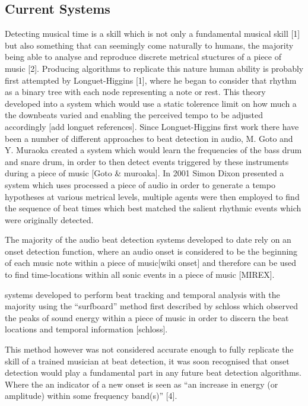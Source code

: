 \documentclass[a4paper, 11pt]{article}
\begin{document}
\subsection{Current Systems}

Detecting musical time is a skill which is not only a fundamental musical skill [1] but also something that can seemingly come naturally to humans, the majority being able to analyse and reproduce discrete metrical stuctures of a piece of music [2]. Producing algorithms to replicate this nature human ability is probably first attempted by Longuet-Higgins [1], where he began to consider that rhythm as a binary tree with each node representing a note or rest. This theory developed into a system which would use a static tolerence limit on how much a the downbeats varied and enabling the perceived tempo to be adjusted accordingly [add longuet references]. Since Longuet-Higgins first work there have been a number of different approaches to beat detection in audio, M. Goto and Y. Muraoka created a system which would learn the frequencies of the bass drum and snare drum, in order to then detect events triggered by these instruments during a piece of music [Goto \& muroaka]. In 2001 Simon Dixon presented a system which uses processed a piece of audio in order to generate a tempo hypotheses at various metrical levels, multiple agents were then employed to find the sequence of beat times which best matched the salient rhythmic events which were originally detected.

The majority of the audio beat detection systems developed to date rely on an onset detection function, where an audio onset is considered to be the beginning of each music note within a piece of music[wiki onset] and therefore can be used to find time-locations within all sonic events in a piece of music [MIREX]. 



systems developed to perform beat tracking and temporal analysis with the majority using the ``surfboard'' method first described by schloss which observed the peaks of sound energy within a piece of music in order to discern the beat locations and temporal information [schloss]. 

This method however was not considered accurate enough to fully replicate the skill of a trained musician at beat detection, it was soon recognised that onset detection would play a fundamental part in any future beat detection algorithms. Where the an indicator of a new onset is seen as ``an increase in energy (or amplitude) within some frequency band(s)'' [4].
\end{document}
